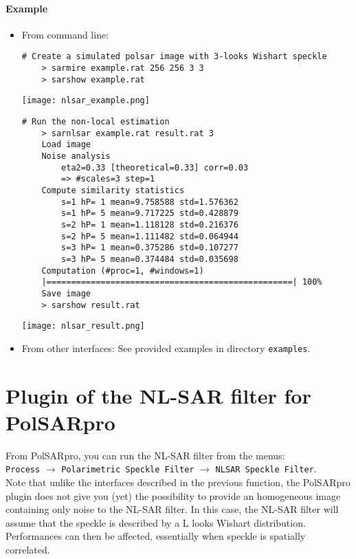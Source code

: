 \documentclass[10pt,french,english,a4paper]{article}
\begin{document}
\paragraph*{Example}

\begin{itemize}
\item From command line:
  \begin{Verbatim}[frame=single]
    # Create a simulated polsar image with 3-looks Wishart speckle
    > sarmire example.rat 256 256 3 3
    > sarshow example.rat
  \end{Verbatim}
  \texttt{[image: nlsar\_example.png]}
  \begin{Verbatim}[frame=single]
    # Run the non-local estimation
    > sarnlsar example.rat result.rat 3
    Load image
    Noise analysis
    	eta2=0.33 [theoretical=0.33] corr=0.03
    	=> #scales=3 step=1
    Compute similarity statistics
    	s=1 hP= 1 mean=9.758588 std=1.576362
    	s=1 hP= 5 mean=9.717225 std=0.428879
    	s=2 hP= 1 mean=1.118128 std=0.216376
    	s=2 hP= 5 mean=1.111482 std=0.064944
    	s=3 hP= 1 mean=0.375286 std=0.107277
    	s=3 hP= 5 mean=0.374484 std=0.035698
    Computation (#proc=1, #windows=1)
    |==================================================| 100%
    Save image
    > sarshow result.rat
  \end{Verbatim}
  \texttt{[image: nlsar\_result.png]}
\item From other interfaces:
  See provided examples in directory \texttt{examples}.
\end{itemize}


\section{Plugin of the NL-SAR filter for PolSARpro}

From PolSARpro, you can run the NL-SAR filter from the menus:\\

\quad \texttt{Process} $\to$ \texttt{Polarimetric Speckle Filter}
$\to$ \texttt{NLSAR Speckle Filter}.\\

Note that unlike the interfaces described in the previous function,
the PolSARpro plugin does not give you (yet) the possibility to provide
an homogeneous image containing only noise
to the NL-SAR filter. In this case, the NL-SAR
filter will assume that the speckle is described by a L looks Wishart
distribution. Performances can then be affected, essentially when speckle
is spatially correlated.\\
\end{document}
